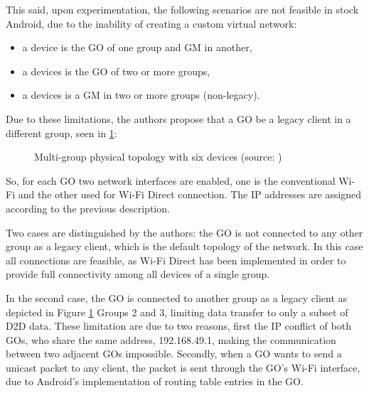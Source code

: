 This said, upon experimentation, the following scenarios are not feasible in stock Android, due to the inability of creating a custom virtual network:

\begin{itemize}
\item a device is the \gls{GO} of one group and \gls{GM} in another,
\item a devices is the \gls{GO} of two or more groups,
\item a devices is a \gls{GM} in two or more groups (non-legacy).
\end{itemize}

Due to these limitations, the authors propose that a \gls{GO} be a legacy client in a different group, seen in \ref{fig:mgrouprouting}:

\begin{figure}[ht]
	\noindent{}
	\caption{\label{fig:mgrouprouting} Multi-group physical topology with six devices (source: \cite{routeMultiGroup})}
\end{figure}

So, for each \gls{GO} two network interfaces are enabled, one is the conventional Wi-Fi and the other used for Wi-Fi Direct connection. The \gls{IP} addresses are assigned according to the previous description.

Two cases are distinguished by the authors: the \gls{GO} is not connected to any other group as a legacy client, which is the default topology of the network. In this case all connections are feasible, as Wi-Fi Direct has been implemented in order to provide full connectivity among all devices of a single group.

In the second case, the \gls{GO} is connected to another group as a legacy client as depicted in Figure \ref{fig:mgrouprouting} Groups 2 and 3, limiting data transfer to only a subset of D2D data. These limitation are due to two reasons, first the \gls{IP} conflict of both \glspl{GO}, who share the same address, 192.168.49.1, making the communication between two adjacent \glspl{GO} impossible. Secondly, when a \gls{GO} wants to send a unicast packet to any client, the packet is sent through the \gls{GO}'s Wi-Fi interface, due to Android's implementation of routing table entries in the \gls{GO}.

